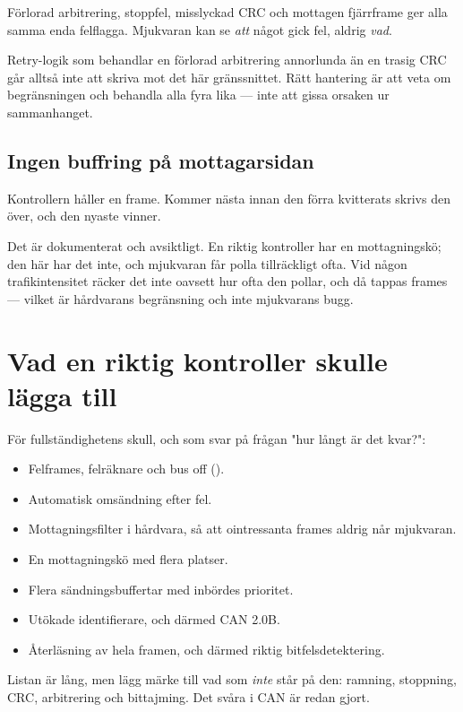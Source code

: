 Förlorad arbitrering, stoppfel, misslyckad CRC och mottagen fjärrframe ger alla samma enda
felflagga. Mjukvaran kan se \emph{att} något gick fel, aldrig \emph{vad}.

Retry-logik som behandlar en förlorad arbitrering annorlunda än en trasig CRC går alltså inte att
skriva mot det här gränssnittet. Rätt hantering är att veta om begränsningen och behandla alla
fyra lika --- inte att gissa orsaken ur sammanhanget.

\subsection{Ingen buffring på mottagarsidan}

Kontrollern håller en frame. Kommer nästa innan den förra kvitterats skrivs den över, och den
nyaste vinner.

Det är dokumenterat och avsiktligt. En riktig kontroller har en mottagningskö; den här har det
inte, och mjukvaran får polla tillräckligt ofta. Vid någon trafikintensitet räcker det inte
oavsett hur ofta den pollar, och då tappas frames --- vilket är hårdvarans begränsning och inte
mjukvarans bugg.

\section{Vad en riktig kontroller skulle lägga till}

För fullständighetens skull, och som svar på frågan "hur långt är det kvar?":

\begin{itemize}
  \item Felframes, felräknare och bus off ().
  \item Automatisk omsändning efter fel.
  \item Mottagningsfilter i hårdvara, så att ointressanta frames aldrig når mjukvaran.
  \item En mottagningskö med flera platser.
  \item Flera sändningsbuffertar med inbördes prioritet.
  \item Utökade identifierare, och därmed CAN 2.0B.
  \item Återläsning av hela framen, och därmed riktig bitfelsdetektering.
\end{itemize}

Listan är lång, men lägg märke till vad som \emph{inte} står på den: ramning, stoppning, CRC,
arbitrering och bittajming. Det svåra i CAN är redan gjort.

